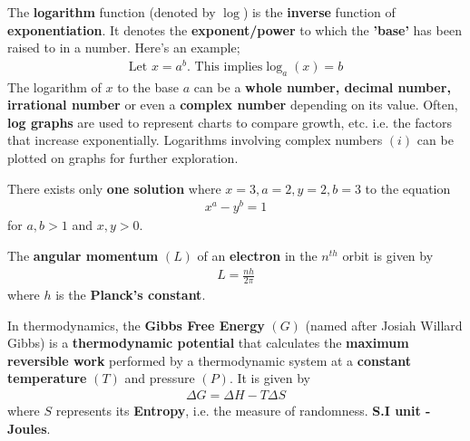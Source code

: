 \documentclass{article}
\begin{document}
\begin{mathbox}
The \textbf{logarithm} function (denoted by $\log$) is the \textbf{inverse} function of \textbf{exponentiation}. It denotes the \textbf{exponent/power} to which the \textbf{'base'} has been raised to in a number. Here's an example;
\begin{align*}
    \text{Let } x = a^b. \text{ This implies} \log_a (x) = b
\end{align*}
The logarithm of $x$ to the base $a$ can be a \textbf{whole number, decimal number, irrational number} or even a \textbf{complex number} depending on its value. Often, \textbf{log graphs} are used to represent charts to compare growth, etc. i.e. the factors that increase exponentially. Logarithms involving complex numbers $(i)$ can be plotted on graphs for further exploration.
\end{mathbox}
\begin{mathbox}

\end{mathbox}
\begin{mathbox}
There exists only \textbf{one solution} where $x=3, a=2, y=2, b=3$ to the equation
\begin{align*} 
    \textbf{$x^a - y^b = 1$} 
\end{align*} 
for \textbf{$a,b > 1$} and \textbf{$x,y > 0$}.
\end{mathbox}
\begin{phybox}
The \textbf{angular momentum} $(L)$ of an \textbf{electron} in the $n^{th}$ orbit is given by 
\begin{align*} 
    L = \frac{nh}{2\pi} 
\end{align*} where $h$ is the \textbf{Planck's constant}. 
\end{phybox}
\begin{chembox}
In thermodynamics, the \textbf{Gibbs Free Energy} $(G)$ (named after Josiah Willard Gibbs) is a \textbf{thermodynamic potential} that calculates the \textbf{maximum reversible work} performed by a thermodynamic system at a \textbf{constant temperature} $(T)$ and pressure\textbf{} $(P)$. It is given by 
\begin{align*} 
    \Delta G=\Delta H-T\Delta S 
\end{align*} where $S$ represents its \textbf{Entropy}, i.e. the measure of randomness. \textbf{S.I unit - Joules}.
\end{chembox}
\end{document}
